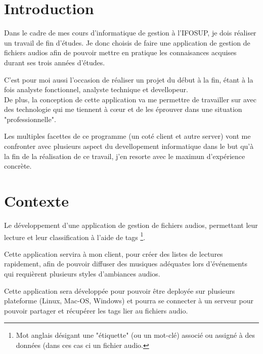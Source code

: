 \documentclass[a4paper,12pt]{report}
\author{Thomas Stassin}
\date{}
\begin{document}


\newpage
\thispagestyle{empty}
\addtocounter{page}{-1}
\null
\newpage



\tableofcontents
\pagebreak

\chapter{Introduction}

Dans le cadre de mes cours d’informatique de gestion à l’IFOSUP, je dois réaliser un travail de fin d’études. Je donc choisis de faire une application de gestion de fichiers audios afin de pouvoir mettre en pratique les connaisances acquises durant ses trois années d'études.

C'est pour moi aussi l'occasion de réaliser un projet du début à la fin, étant à la fois analyste fonctionnel, analyste technique et devellopeur.\\

De plus, la conception de cette application va me permettre de travailler sur avec des technologie qui me tiennent à c\oe{}ur et de les éprouver dans une situation "professionnelle".

Les multiples facettes de ce programme (un coté client et autre server) vont me confronter avec plusieurs aspect du devellopement informatique dans le but qu'à la fin de la réalisation de ce travail, j'en resorte avec le maximun d'expérience concrète.


\chapter{Contexte}

Le développement d'une application de gestion de fichiers audios, permettant leur lecture et leur classification à l'aide de tags \footnote{Mot anglais désigant une "étiquette" (ou un mot-clé) associé ou assigné à des données (dans ces cas ci un fichier audio.}.

Cette application servira à mon client, pour créer des listes de lectures rapidement, afin de pouvoir diffuser des musiques adéquates lors d'événements qui requièrent plusieurs styles d'ambiances audios.

Cette application sera développée pour pouvoir être deployée sur plusieurs plateforme (Linux, Mac-OS, Windows) et pourra se connecter à un serveur pour pouvoir partager et récupérer les tags lier au fichiers audio.
\end{document}
